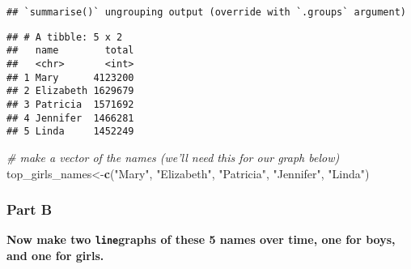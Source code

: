 \documentclass[
]{article}
\newenvironment{Shaded}{\begin{snugshade}}{\end{snugshade}}
\newcommand{\CommentTok}[1]{\textcolor[rgb]{0.56,0.35,0.01}{\textit{#1}}}
\newcommand{\DataTypeTok}[1]{\textcolor[rgb]{0.13,0.29,0.53}{#1}}
\newcommand{\DecValTok}[1]{\textcolor[rgb]{0.00,0.00,0.81}{#1}}
\newcommand{\KeywordTok}[1]{\textcolor[rgb]{0.13,0.29,0.53}{\textbf{#1}}}
\newcommand{\NormalTok}[1]{#1}
\newcommand{\OperatorTok}[1]{\textcolor[rgb]{0.81,0.36,0.00}{\textbf{#1}}}
\newcommand{\StringTok}[1]{\textcolor[rgb]{0.31,0.60,0.02}{#1}}
\begin{document}
\begin{Shaded}
\end{Shaded}

\begin{verbatim}
## `summarise()` ungrouping output (override with `.groups` argument)
\end{verbatim}

\begin{verbatim}
## # A tibble: 5 x 2
##   name        total
##   <chr>       <int>
## 1 Mary      4123200
## 2 Elizabeth 1629679
## 3 Patricia  1571692
## 4 Jennifer  1466281
## 5 Linda     1452249
\end{verbatim}

\begin{Shaded}
\begin{Highlighting}[]
\CommentTok{# make a vector of the names (we'll need this for our graph below)}
\NormalTok{top_girls_names<-}\KeywordTok{c}\NormalTok{(}\StringTok{"Mary"}\NormalTok{, }\StringTok{"Elizabeth"}\NormalTok{, }\StringTok{"Patricia"}\NormalTok{, }\StringTok{"Jennifer"}\NormalTok{, }\StringTok{"Linda"}\NormalTok{)}
\end{Highlighting}
\end{Shaded}

\hypertarget{part-b-2}{%
\subsubsection{Part B}\label{part-b-2}}

\textbf{Now make two \texttt{line}graphs of these 5 names over time, one
for boys, and one for girls.}
\end{document}
